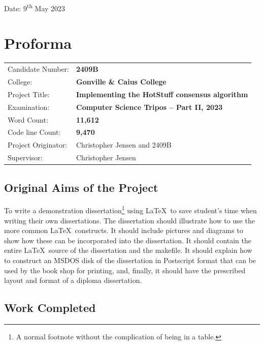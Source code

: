 \documentclass[12pt]{report}
\begin{document}
\noindent Date: 9\textsuperscript{th} May 2023

\chapter*{Proforma}

{\large
\begin{tabular}{ll}
Candidate Number:   & \bf 2409B \\
College:            & \bf Gonville \& Caius College                    \\
Project Title:      & \bf Implementing the HotStuff consensus algorithm \\
Examination:        & \bf Computer Science Tripos -- Part II, 2023  \\
Word Count:         & \bf 11,612\footnotemark[1] \\
Code line Count:    & \bf 9,470\footnotemark[2] \\
Project Originator: & Christopher Jensen and 2409B \\
Supervisor:         & Christopher Jensen \\ 
\end{tabular}
}

\section*{Original Aims of the Project}

To write a demonstration dissertation\footnote{A normal footnote without the
complication of being in a table.} using \LaTeX\ to save
student's time when writing their own dissertations. The dissertation
should illustrate how to use the more common \LaTeX\ constructs. It
should include pictures and diagrams to show how these can be
incorporated into the dissertation.  It should contain the entire
\LaTeX\ source of the dissertation and the makefile.  It should
explain how to construct an MSDOS disk of the dissertation in
Postscript format that can be used by the book shop for printing, and,
finally, it should have the prescribed layout and format of a diploma
dissertation.


\section*{Work Completed}
\end{document}
